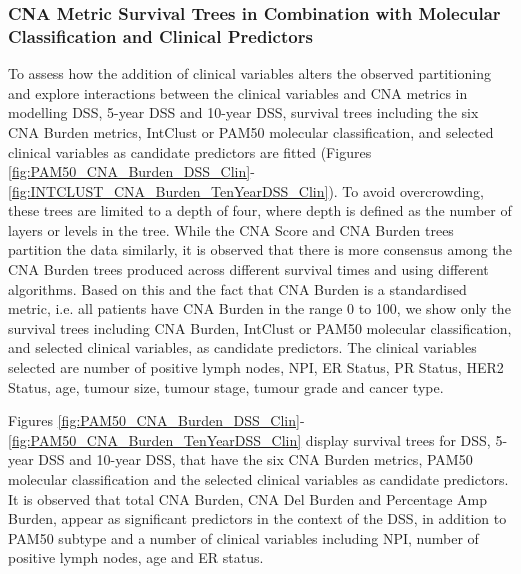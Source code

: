 \subsubsection{CNA Metric Survival Trees in Combination with Molecular Classification and Clinical Predictors}
To assess how the addition of clinical variables alters the observed partitioning and explore interactions between the clinical variables and CNA metrics in modelling DSS, 5-year DSS and 10-year DSS, survival trees including the six CNA Burden metrics, IntClust or PAM50 molecular classification, and selected clinical variables as candidate predictors are fitted (Figures \ref{fig:PAM50_CNA_Burden_DSS_Clin}-\ref{fig:INTCLUST_CNA_Burden_TenYearDSS_Clin}). To avoid overcrowding, these trees are limited to a depth of four, where depth is defined as the number of layers or levels in the tree. While the CNA Score and CNA Burden trees partition the data similarly, it is observed that there is more consensus among the CNA Burden trees produced across different survival times and using different algorithms. Based on this and the fact that CNA Burden is a standardised metric, i.e. all patients have CNA Burden in the range 0 to 100, we show only the survival trees including CNA Burden, IntClust or PAM50 molecular classification, and selected clinical variables, as candidate predictors. The clinical variables selected are number of positive lymph nodes, NPI, ER Status, PR Status, HER2 Status, age, tumour size, tumour stage, tumour grade and cancer type.  

Figures \ref{fig:PAM50_CNA_Burden_DSS_Clin}-\ref{fig:PAM50_CNA_Burden_TenYearDSS_Clin} display survival trees for DSS, 5-year DSS and 10-year DSS, that have the six CNA Burden metrics, PAM50 molecular classification and the selected clinical variables as candidate predictors. It is observed that total CNA Burden, CNA Del Burden and Percentage Amp Burden, appear as significant predictors in the context of the DSS, in addition to PAM50 subtype and a number of clinical variables including NPI, number of positive lymph nodes, age and ER status.

